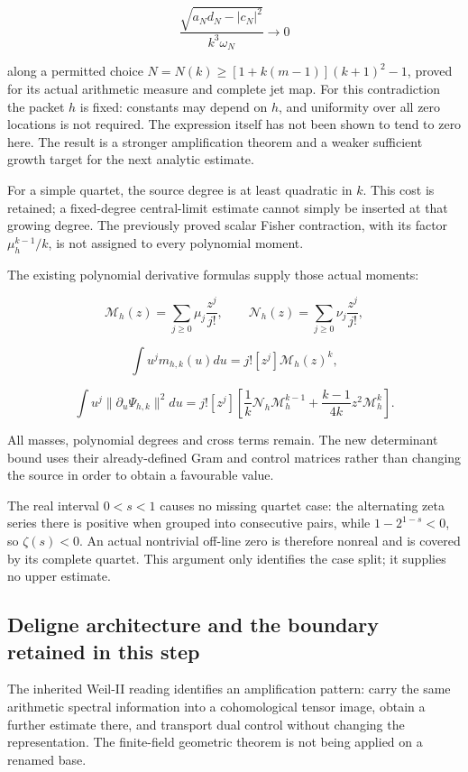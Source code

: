 \[
\boxed{
\frac{\sqrt{a_Nd_N-|c_N|^2}}{k^3\omega_N}\longrightarrow0
}
\]

along a permitted choice \(N=N(k)\geq[1+k(m-1)](k+1)^2-1\), proved for
its actual arithmetic measure and complete jet map. For this
contradiction the packet \(h\) is fixed: constants may depend on \(h\),
and uniformity over all zero locations is not required. The expression
itself has not been shown to tend to zero here. The result is a stronger
amplification theorem and a weaker sufficient growth target for the next
analytic estimate.

For a simple quartet, the source degree is at least quadratic in \(k\).
This cost is retained; a fixed-degree central-limit estimate cannot
simply be inserted at that growing degree. The previously proved scalar
Fisher contraction, with its factor \(\mu_h^{k-1}/k\), is not assigned
to every polynomial moment.

The existing polynomial derivative formulas supply those actual moments:

\[
\mathcal M_h(z)=\sum_{j\geq0}\mu_j\frac{z^j}{j!},\qquad
\mathcal N_h(z)=\sum_{j\geq0}\nu_j\frac{z^j}{j!},
\]

\[
\int u^j m_{h,k}(u)du=j![z^j]\mathcal M_h(z)^k,
\]

\[
\int u^j\|\partial_u\Psi_{h,k}\|^2du
=j![z^j]\left[
\frac1k\mathcal N_h\mathcal M_h^{k-1}
+\frac{k-1}{4k}z^2\mathcal M_h^k\right].
\]

All masses, polynomial degrees and cross terms remain. The new
determinant bound uses their already-defined Gram and control matrices
rather than changing the source in order to obtain a favourable value.

The real interval \(0<s<1\) causes no missing quartet case: the
alternating zeta series there is positive when grouped into consecutive
pairs, while \(1-2^{1-s}<0\), so \(\zeta(s)<0\). An actual nontrivial
off-line zero is therefore nonreal and is covered by its complete
quartet. This argument only identifies the case split; it supplies no
upper estimate.

\subsection{Deligne architecture and the boundary retained in this
step}\label{exttrace-deligne-architecture-and-the-boundary-retained-in-this-step}

The inherited Weil-II reading identifies an amplification pattern: carry
the same arithmetic spectral information into a cohomological tensor
image, obtain a further estimate there, and transport dual control
without changing the representation. The finite-field geometric theorem
is not being applied on a renamed base.

